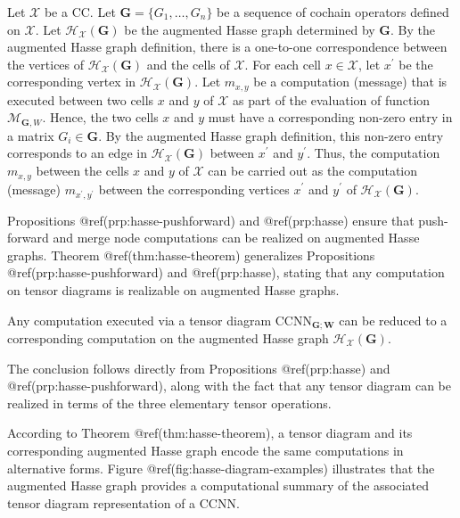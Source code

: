 \documentclass[
  12pt,
]{krantz}
\begin{document}
Let \(\mathcal{X}\) be a CC. Let \(\mathbf{G}=\{ G_1,\ldots,G_n\}\) be a
sequence of cochain operators defined on \(\mathcal{X}\). Let
\(\mathcal{H}_{\mathcal{X}}(\mathbf{G})\) be the augmented Hasse graph
determined by \(\mathbf{G}\). By the augmented Hasse graph definition,
there is a one-to-one correspondence between the vertices of
\(\mathcal{H}_{\mathcal{X}}(\mathbf{G})\) and the cells of
\(\mathcal{X}\). For each cell \(x\in \mathcal{X}\), let \(x^{\prime}\)
be the corresponding vertex in
\(\mathcal{H}_{\mathcal{X}}(\mathbf{G})\). Let \(m_{x,y}\) be a
computation (message) that is executed between two cells \(x\) and \(y\)
of \(\mathcal{X}\) as part of the evaluation of function
\(\mathcal{M}_{\mathbf{G},W}\). Hence, the two cells \(x\) and \(y\)
must have a corresponding non-zero entry in a matrix
\(G_i\in\mathbf{G}\). By the augmented Hasse graph definition, this
non-zero entry corresponds to an edge in
\(\mathcal{H}_{\mathcal{X}}(\mathbf{G})\) between \(x^{\prime}\) and
\(y^{\prime}\). Thus, the computation \(m_{x,y}\) between the cells
\(x\) and \(y\) of \(\mathcal{X}\) can be carried out as the computation
(message) \(m_{x^{\prime},y^{\prime}}\) between the corresponding
vertices \(x^{\prime}\) and \(y^{\prime}\) of
\(\mathcal{H}_{\mathcal{X}}(\mathbf{G})\).

Propositions @ref(prp:hasse-pushforward) and @ref(prp:hasse) ensure that
push-forward and merge node computations can be realized on augmented
Hasse graphs. Theorem @ref(thm:hasse-theorem) generalizes Propositions
@ref(prp:hasse-pushforward) and @ref(prp:hasse), stating that any
computation on tensor diagrams is realizable on augmented Hasse graphs.

\label{hasse-theorem}
Any computation executed via a tensor diagram
\(\mbox{CCNN}_{\mathbf{G};\mathbf{W}}\) can be reduced to a
corresponding computation on the augmented Hasse graph
\(\mathcal{H}_{\mathcal{X}}(\mathbf{G})\).

The conclusion follows directly from Propositions @ref(prp:hasse) and
@ref(prp:hasse-pushforward), along with the fact that any tensor diagram
can be realized in terms of the three elementary tensor operations.

According to Theorem @ref(thm:hasse-theorem), a tensor diagram and its
corresponding augmented Hasse graph encode the same computations in
alternative forms. Figure @ref(fig:hasse-diagram-examples) illustrates
that the augmented Hasse graph provides a computational summary of the
associated tensor diagram representation of a CCNN.
\end{document}
